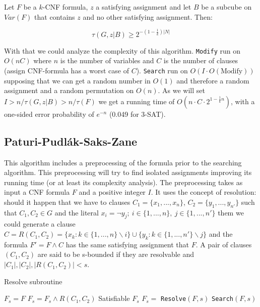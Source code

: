 \begin{theorem}  Let $F$ be a $k$-CNF formula, $z$ a satisfying assignment and let $B$ be a subcube on $Var(F)$ that contains $z$ and no other satisfying assignment. Then:

  $$ \tau(G, z|B) \ge 2^{-(1-\frac{1}{k})|N|}$$
\end{theorem}


With that we could analyze the complexity of this algorithm. \texttt{Modify} run on $O(nC)$ where $n$ is the number of variables and $C$ is the number of clauses (assign CNF-formula has a worst case of $C$).  \texttt{Search} run on $O(I\cdot O(\text{Modify}))$ supposing that we can get a random number in $O(1)$ and therefore a random assignment and a  random permutation on $O(n)$. As we will set $I> n/\tau(G,z|B)>n/\tau(F)$ we get a running time of $O(n\cdot C\cdot 2^{1-\frac{1}{k}n})$, with a one-sided error probability of $e^{-n}$ (0.049 for 3-SAT).


\subsection{Paturi-Pudlák-Saks-Zane}

This algorithm includes a preprocessing of the formula prior to the searching algorithm. This preprocessing will try to find isolated assignments improving its running time (or at least its complexity analysis). The preprocessing takes as input a CNF formula $F$ and a positive integer $I$. It uses the concept of resolution: should it happen that we have to clauses $C_1 = \{x_1,...,x_n\}$, $C_2 = \{y_1,...,y_{n'}\}$  such that $C_1,C_2 \in G$ and the literal $x_i = \neg y_j; \ i\in\{1,...,n\},\ j \in \{1,...,n'\} $ them we could generate a clause $C = R(C_1,C_2) = \{x_k : k \in\{1,...,n\}\backslash i\} \cup \{y_k : k \in\{1,...,n'\}\backslash j\}$ and the formula $F' = F \wedge C$ has the same satisfying assignment that $F$. A pair of clauses $(C_1,C_2)$ are said to be s-bounded if they are resolvable and $|C_1|,|C_2|, |R(C_1,C_2)| < s$.

\begin{algorithm}
  \caption{Resolve subroutine}\label{alg:resolve}
  \begin{algorithmic}[1]
    \State $F_s = F$
    \State $F_s  = F_s \wedge R(C_1, C_2)$
    \EndWhile
    \State \Return Satisfiable
    \State \Return $F_s$
    \EndProcedure
    \State
    \State $F_s =$ \texttt{Resolve}$(F,s)$
    \State \Return \texttt{Search}$(F,s)$
	\EndProcedure
  \end{algorithmic}
\end{algorithm}

